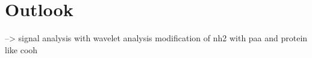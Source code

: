 \chapter{Outlook}


--> signal analysis with wavelet analysis
modification of nh2 with paa and protein like cooh